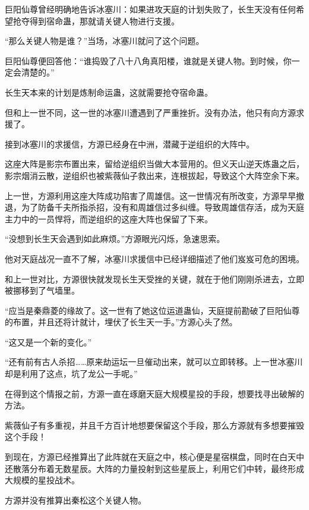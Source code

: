 
\begin{this_body}



巨阳仙尊曾经明确地告诉冰塞川：如果进攻天庭的计划失败了，长生天没有任何希望抢夺得到宿命蛊，那就请关键人物进行支援。

“那么关键人物是谁？”当场，冰塞川就问了这个问题。

巨阳仙尊便回答他：“谁捣毁了八十八角真阳楼，谁就是关键人物。到时候，你一定会清楚的。”

长生天本来的计划是炼制命运蛊，这就需要抢夺宿命蛊。

但和上一世不同，这一世的冰塞川遭遇到了严重挫折。没有办法，他只有向方源求援了。

接到冰塞川的求援信，方源已经身在中洲，潜藏于逆组织的大阵中。

这座大阵是影宗布置出来，留给逆组织当做大本营用的。但义天山逆天炼蛊之后，影宗烟消云散，逆组织也被紫薇仙子救出来，连根拔起，导致这个大阵空余下来。

上一世，方源利用这座大阵成功陷害了周雄信。这一世情况有所改变，方源早早撤退，为了防备千夫所指杀招，没有和周雄信过多纠缠。导致周雄信存活，成为天庭主力中的一员悍将，而逆组织的这座大阵也保留了下来。

“没想到长生天会遇到如此麻烦。”方源眼光闪烁，急速思索。

他对天庭战况一直不了解，冰塞川求援信中已经详细描述了他们岌岌可危的困境。

和上一世对比，方源很快就发现长生天受挫的关键，就在于他们刚刚杀进去，立即被挪移到了气墙里。

“应当是秦鼎菱的缘故了。这一世有了她这位运道蛊仙，天庭提前勘破了巨阳仙尊的布置，并且还将计就计，埋伏了长生天一手。”方源心头了然。

“这又是一个新的变化。”

“还有前有古人杀招……原来劫运坛一旦催动出来，就可以立即转移。上一世冰塞川却是利用了这点，坑了龙公一手呢。”

在得到这个情报之前，方源一直在琢磨天庭大规模星投的手段，想要找寻出破解的方法。

紫薇仙子有多重视，并且千方百计地想要保留这个手段，那么方源就有多想要摧毁这个手段！

到现在，方源已经推算出了此阵就在天庭之中，核心便是星宿棋盘，同时在白天中还散落分布着无数星辰。大阵的力量投射到这些星辰上，利用它们中转，最终形成大规模的星投战术。

方源并没有推算出秦松这个关键人物。


\end{this_body}
